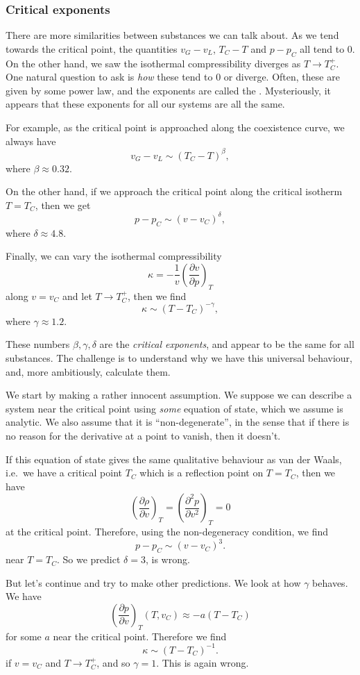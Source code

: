 \documentclass[a4paper]{article}
\begin{document}
\subsubsection*{Critical exponents}
There are more similarities between substances we can talk about. As we tend towards the critical point, the quantities $v_G - v_L$, $T_C - T$ and $p - p_C$ all tend to $0$. On the other hand, we saw the isothermal compressibility diverges as $T \to T_C^+$. One natural question to ask is \emph{how} these tend to $0$ or diverge. Often, these are given by some power law, and the exponents are called the . Mysteriously, it appears that these exponents for all our systems are all the same.

For example, as the critical point is approached along the coexistence curve, we always have
\[
  v_G - v_L \sim (T_C - T)^\beta,
\]
where $\beta \approx 0.32$.

On the other hand, if we approach the critical point along the critical isotherm $T = T_C$, then we get
\[
  p - p_C \sim (v - v_C)^\delta,
\]
where $\delta \approx 4.8$.

Finally, we can vary the isothermal compressibility
\[
  \kappa = - \frac{1}{v} \left(\frac{\partial v}{\partial p}\right)_T
\]
along $v = v_C$ and let $T \to T_C^+$, then we find
\[
  \kappa \sim (T - T_C)^{-\gamma},
\]
where $\gamma \approx 1.2$.

These numbers $\beta, \gamma, \delta$ are the \emph{critical exponents}, and appear to be the same for all substances. The challenge is to understand why we have this universal behaviour, and, more ambitiously, calculate them.

We start by making a rather innocent assumption. We suppose we can describe a system near the critical point using \emph{some} equation of state, which we assume is analytic. We also assume that it is ``non-degenerate'', in the sense that if there is no reason for the derivative at a point to vanish, then it doesn't.

If this equation of state gives the same qualitative behaviour as van der Waals, i.e.\ we have a critical point $T_C$ which is a reflection point on $T = T_C$, then we have
\[
  \left(\frac{\partial \rho}{\partial v}\right)_T = \left(\frac{\partial^2 p}{\partial v^2}\right)_T = 0
\]
at the critical point. Therefore, using the non-degeneracy condition, we find
\[
  p - p_C \sim (v - v_C)^3.
\]
near $T = T_C$. So we predict $\delta = 3$, is wrong.

But let's continue and try to make other predictions. We look at how $\gamma$ behaves. We have
\[
  \left(\frac{\partial p}{\partial v}\right)_T (T, v_C) \approx - a(T - T_C)
\]
for some $a$ near the critical point. Therefore we find
\[
  \kappa \sim (T - T_C)^{-1}.
\]
if $v = v_C$ and $T \to T_C^+$, and so $\gamma = 1$. This is again wrong.
\end{document}
